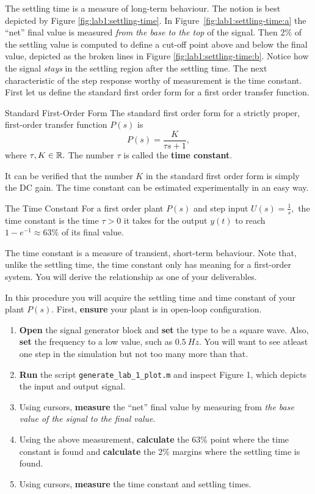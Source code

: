 %
The settling time is a measure of long-term behaviour.
The notion is best depicted by Figure
\ref{fig:lab1:settling-time}.
In Figure~\ref{fig:lab1:settling-time:a} the ``net'' final value is
measured \emph{from the base to the top} of the signal. Then \(2\%\) of the
settling value is computed to define a cut-off point above and below the final
value, depicted as the broken lines in Figure
\ref{fig:lab1:settling-time:b}. Notice how the signal \emph{stays} in the
settling region after the settling time.
The next characteristic of the step response worthy of measurement is the
time constant. First let us define the standard first order form for a first
order transfer function.
%
\begin{definition}[]{Standard First-Order Form}
  The standard first order form for a strictly proper, first-order transfer
  function \(P(s)\) is
  \[
    P(s) = \frac{K}{\tau s + 1},
  \]
  where \(\tau, K \in \mathbb{R}.\) The number \(\tau\) is called the \textbf{time
  constant}.
\end{definition}
%
It can be verified that the number \(K\) in the standard first order form
is simply the DC gain. The time constant can be estimated experimentally
in an easy way.
%
\begin{definition}[]{The Time Constant}
  For a first order plant \(P(s)\) and step input \(U(s) = \frac{1}{s},\)
  the time constant is the time \(\tau > 0\) it takes for
  the output \(y(t)\) to reach \(1-e^{-1} \approx 63\%\) of its final value.
\end{definition}
%
The time constant is a measure of transient, short-term behaviour. Note that,
unlike the settling time, the time constant only has meaning for a
first-order system. You will derive the relationship as one of your
deliverables.
%
\begin{procedure}[label={proc:lab1:p4}]
  In this procedure you will acquire the settling time and time constant
  of your plant \(P(s).\) First, \textbf{ensure} your plant is in open-loop
  configuration.
  \begin{enumerate}[label=(\arabic*)]
    \item{
      \textbf{Open} the signal generator block and \textbf{set} the type
      to be a square wave. Also, \textbf{set} the frequency to a low value,
      such as \(\SI{0.5}{Hz}.\) You will want to see atleast one step in
      the simulation but not too many more than that.
    }
    \item{
      \textbf{Run} the script \texttt{generate\_lab\_1\_plot.m} and inspect
      Figure 1, which depicts the input and output signal.
    }
    \item{
      Using cursors, \textbf{measure} the ``net'' final value by measuring from
      \emph{the base value of the signal to the final value}.
    }
    \item{
      Using the above measurement, \textbf{calculate} the \(63\%\) point
      where the time constant is found and \textbf{calculate} the \(2\%\)
      margins where the settling time is found.
    }
    \item{
      Using cursors, \textbf{measure} the time constant and settling times.
    }
  \end{enumerate}
\end{procedure}
